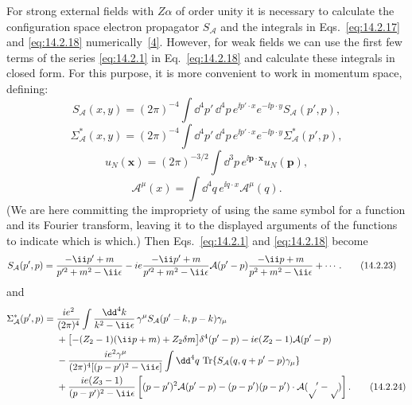 For strong external fields with $Z\alpha$ of order unity it is necessary to
calculate the configuration space electron propagator $S_{\mathcal A}$ and the
integrals in Eqs.~\eqref{eq:14.2.17} and \eqref{eq:14.2.18}
numerically~\hyperlink{ref:14.4}{[4]}. However, for weak fields we can use the
first few terms of the series \eqref{eq:14.2.1} in Eq.~\eqref{eq:14.2.18} and
calculate these integrals in closed form. For this purpose, it is more
convenient to work in momentum space, defining:
\begin{equation}
 S_{\mathcal A}(x,y)=(2\pi)^{-4}\int \dd^4p'\,\dd^4p\,
 e^{\ii p'\cdot x}e^{-\ii p\cdot y}S_{\mathcal A}(p',p),
 \tag{14.2.19}\label{eq:14.2.19}
\end{equation}
\begin{equation}
 \Sigma^*_{\mathcal A}(x,y)=(2\pi)^{-4}\int \dd^4p'\,\dd^4p\,
 e^{\ii p'\cdot x}e^{-\ii p\cdot y}\Sigma^*_{\mathcal A}(p',p),
 \tag{14.2.20}\label{eq:14.2.20}
\end{equation}
\begin{equation}
 u_N(\mathbf x)=(2\pi)^{-3/2}\int \dd^3p\,e^{\ii\mathbf p\cdot\mathbf x}u_N(\mathbf p),
 \tag{14.2.21}\label{eq:14.2.21}
\end{equation}
\begin{equation}
 \mathcal A^\mu(x)=\int \dd^4q\,e^{\ii q\cdot x}\mathcal A^\mu(q).
 \tag{14.2.22}\label{eq:14.2.22}
\end{equation}
(We are here committing the impropriety of using the same symbol for a function
and its Fourier transform, leaving it to the displayed arguments of the
functions to indicate which is which.) Then Eqs.~\eqref{eq:14.2.1} and
\eqref{eq:14.2.18} become
\begin{align}
 S_{\mathcal A}(p',p)={}&\frac{-\ii\sl{p}'+m}{p'^2+m^2-\ii\epsilon}
 -ie\frac{-\ii\sl{p}'+m}{p'^2+m^2-\ii\epsilon}
 \sl{\mathcal A}(p'-p)\frac{-\ii\sl{p}+m}{p^2+m^2-\ii\epsilon}
 +\cdots .
 \tag{14.2.23}\label{eq:14.2.23}
\end{align}
and
\begin{align}
 \Sigma^*_{\mathcal A}(p',p)={}&
 \frac{ie^2}{(2\pi)^4}\int\frac{\dd^4k}{k^2-\ii\epsilon}\,
 \gamma^\mu S_{\mathcal A}(p'-k,p-k)\gamma_\mu
 \notag\\
 &+\bigl[-(Z_2-1)(\ii\sl{p}+m)+Z_2\delta m\bigr]\delta^4(p'-p)
 -ie(Z_2-1)\sl{\mathcal A}(p'-p)
 \notag\\
 &-\frac{ie^2\gamma^\mu}{(2\pi)^4[(p-p')^2-\ii\epsilon]}
 \int \dd^4q\,\operatorname{Tr}\{S_{\mathcal A}(q,q+p'-p)\gamma_\mu\}
 \notag\\
 &+\frac{ie(Z_3-1)}{(p-p')^2-\ii\epsilon}
 \left[(p-p')^2\sl{\mathcal A}(p'-p)
 -(\sl{p}-\sl{p}')(p-p')\cdot\mathcal A(p'-p)\right].
 \tag{14.2.24}\label{eq:14.2.24}
\end{align}

